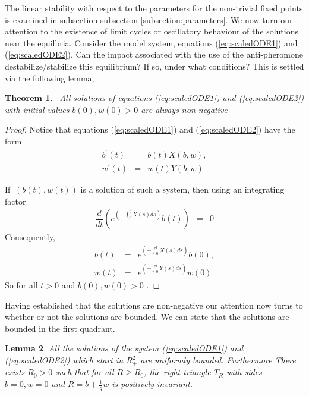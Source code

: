\documentclass[review]{elsarticle}
\newtheorem{theorem}{Theorem}[section]
\newtheorem{lemma}[theorem]{Lemma}
\begin{document}
The linear stability with respect to the parameters for the
non-trivial fixed points is examined in subsection subsection
\ref{subsection:parameters}. We now turn our attention to the
existence of limit cycles or oscillatory behaviour of the solutions
near the equilbria. Consider the model system, equations
(\ref{eq:scaledODE1}) and (\ref{eq:scaledODE2}). Can the impact
associated with the use of the anti-pheromone destabilize/stabilize
this equilibrium? If so, under what conditions? This is settled via
the following lemma,
\begin{theorem}
  \bigskip\ All solutions of equations (\ref{eq:scaledODE1}) and
  (\ref{eq:scaledODE2}) with initial values
  $b\left( 0\right) ,w\left( 0\right) >0$ are always non-negative
\end{theorem}


\begin{proof}
  Notice that equations (\ref{eq:scaledODE1}) and
  (\ref{eq:scaledODE2}) have the form
\begin{eqnarray}
  b^{\prime}\left( t \right) & = & b(t)X\left( b,w\right), \\
  w^{\prime}\left( t \right) & = & w(t)Y\left( b,w\right)
\end{eqnarray}


If $\ \left( b\left( t\right) ,w\left( t\right) \right)
$ is a solution of such a system, then using an integrating factor
\begin{eqnarray}
\dfrac{d}{dt}\left( e^{\left( -\int_{0}^{t}X(s)ds\right) }b(t)\right) & = & 0
\end{eqnarray}
Consequently,
\begin{eqnarray}
b(t) & = & e^{\left( -\int_{0}^{t}X(s)ds\right) }b(0), \\
w(t) & = & e^{\left( -\int_{0}^{t}Y(s)ds\right) }w(0).
\end{eqnarray}
So for all $t>0$ and $b\left( 0\right) ,w\left( 0\right) >0$ .
\end{proof}

Having established that the solutions are non-negative our attention
now turns to whether or not the solutions are bounded. We can state
that the solutions are bounded in the first quadrant.
\begin{lemma} \label{mm}
All the solutions of the system (\ref{eq:scaledODE1}) and (\ref{eq:scaledODE2}) which start in $R_{+}^{2}$ are
uniformly bounded. Furthermore There exists $R_{0}>0$  such that for all $R\geq R_{0}$, the right
triangle $T_{R}$ with sides $b=0, w=0$ and $R=b+\frac{1}{g}w $ is positively invariant.
\end{lemma}
\end{document}

